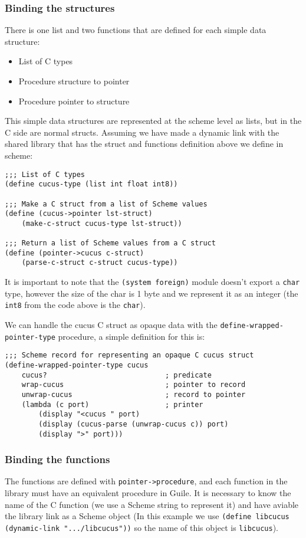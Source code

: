 \documentclass[latterpaper, leqno]{article}
\begin{document}
\subsubsection*{Binding the structures}
There is one list and two functions that are defined for each simple data structure:
\begin{itemize}
  \item List of C types
  \item Procedure structure to pointer
  \item Procedure pointer to structure
\end{itemize}

This simple data structures are represented at the scheme level as lists, but in the C side are normal structs. Assuming we have made a dynamic link with the shared library that has the struct and functions definition above we define in scheme:

\begin{verbatim}
;;; List of C types
(define cucus-type (list int float int8))

;;; Make a C struct from a list of Scheme values
(define (cucus->pointer lst-struct)
    (make-c-struct cucus-type lst-struct))

;;; Return a list of Scheme values from a C struct
(define (pointer->cucus c-struct)
    (parse-c-struct c-struct cucus-type))
\end{verbatim}

It is important to note that the \texttt{(system foreign)} module doesn't export a \texttt{char} type, however the size of the char is 1 byte and we represent it as an integer (the \texttt{int8} from the code above is the \texttt{char}).

We can handle the cucus C struct as opaque data with the \texttt{define-wrapped-pointer-type} procedure, a simple definition for this is:

\begin{verbatim}
;;; Scheme record for representing an opaque C cucus struct
(define-wrapped-pointer-type cucus
    cucus?                            ; predicate
    wrap-cucus                        ; pointer to record
    unwrap-cucus                      ; record to pointer
    (lambda (c port)                  ; printer
        (display "<cucus " port)
        (display (cucus-parse (unwrap-cucus c)) port)
        (display ">" port)))
\end{verbatim}

\subsubsection*{Binding the functions}
The functions are defined with \texttt{pointer->procedure}, and each function in the library must have an equivalent procedure in Guile. It is necessary to know the name of the C function (we use a Scheme string to represent it) and have aviable the library link as a Scheme object (In this example we use \texttt{(define libcucus (dynamic-link ".../libcucus"))} so the name of this object is \texttt{libcucus}).
\end{document}
